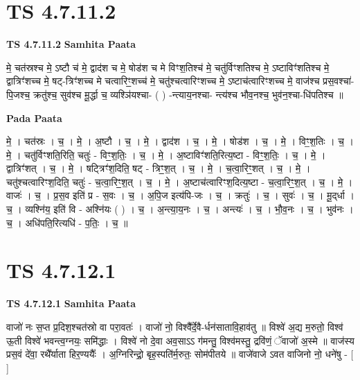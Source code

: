 \documentclass[17pt]{extarticle}
\begin{document}

\section{ TS 4.7.11.2 }

\textbf{TS 4.7.11.2 } \newline
\textbf{Samhita Paata} \newline

मे॒ चत॑स्रश्च मे॒ ऽष्टौ च॑ मे॒ द्वाद॑श च मे॒ षोड॑श च मे विꣳश॒तिश्च॑ मे॒ चतु॑र्विꣳशतिश्च मे॒ ऽष्टाविꣳ॑शतिश्च मे॒ द्वात्रिꣳ॑शच्च मे॒ षट्-त्रिꣳ॑शच्च मे चत्वारिꣳ॒॒शच्च॑ मे॒ चतु॑श्चत्वारिꣳशच्च मे॒ ऽष्टाच॑त्वारिꣳशच्च मे॒ वाज॑श्च प्रस॒वश्चा॑-पि॒जश्च॒ क्रतु॑श्च॒ सुव॑श्च मू॒र्द्धा च॒ व्यश्ञि॑यश्चा- ( ) -न्त्याय॒नश्चा- न्त्य॑श्च भौव॒नश्च॒ भुव॑न॒श्चा-धि॑पतिश्च ॥ \newline

\textbf{Pada Paata} \newline

मे॒ । चत॑स्रः । च॒ । मे॒ । अ॒ष्टौ । च॒ । मे॒ । द्वाद॑श । च॒ । मे॒ । षोड॑श । च॒ । मे॒ । विꣳ॒श॒तिः । च॒ । मे॒ । चतु॑र्विꣳशति॒रिति॒ चतुः॑ - विꣳ॒॒श॒तिः॒ । च॒ । मे॒ । अ॒ष्टाविꣳ॑शति॒रित्य॒ष्टा - विꣳ॒॒श॒तिः॒ । च॒ । मे॒ । द्वात्रिꣳ॑शत् । च॒ । मे॒ । षट्त्रिꣳ॑श॒दिति॒ षट् - त्रिꣳ॒॒श॒त् । च॒ । मे॒ । च॒त्वा॒रिꣳ॒॒शत् । च॒ । मे॒ । चतु॑श्चत्वारिꣳश॒दिति॒ चतुः॑ - च॒त्वा॒रिꣳ॒॒श॒त् । च॒ । मे॒ । अ॒ष्टाच॑त्वारिꣳश॒दित्य॒ष्टा - च॒त्वा॒रिꣳ॒॒श॒त् । च॒ । मे॒ । वाजः॑ । च॒ । प्र॒स॒व इति॑ प्र - स॒वः । च॒ । अ॒पि॒ज इत्य॑पि-जः । च॒ । क्रतुः॑ । च॒ । सुवः॑ । च॒ । मू॒द्‌र्धा । च॒ । व्यश्नि॑य॒ इति॑ वि - अश्नि॑यः ( ) । च॒ । अ॒न्त्या॒य॒नः । च॒ । अन्त्यः॑ । च॒ । भौ॒व॒नः । च॒ । भुव॑नः । च॒ । अधि॑पति॒रित्यधि॑ - प॒तिः॒ । च॒ ॥  \newline





\section{ TS 4.7.12.1 }

\textbf{TS 4.7.12.1 } \newline
\textbf{Samhita Paata} \newline

वाजो॑ नः स॒प्त प्र॒दिश॒श्चत॑स्रो वा परा॒वतः॑ । वाजो॑ नो॒ विश्वै᳚र्दे॒वै-र्धन॑सातावि॒हाव॑तु ॥ विश्वे॑ अ॒द्य म॒रुतो॒ विश्व॑ ऊ॒ती विश्वे॑ भवन्त्व॒ग्नयः॒ समि॑द्धाः । विश्वे॑ नो दे॒वा अव॒साऽऽ ग॑मन्तु॒ विश्व॑मस्तु॒ द्रवि॑णं॒ ॅवाजो॑ अ॒स्मे ॥ वाज॑स्य प्रस॒वं दे॑वा॒ रथै᳚र्याता हिर॒ण्ययैः᳚ । अ॒ग्निरिन्द्रो॒ बृह॒स्पति॑र्म॒रुतः॒ सोम॑पीतये ॥ वाजे॑वाजे ऽवत वाजिनो नो॒ धने॑षु - [  ] \newline
\end{document}
